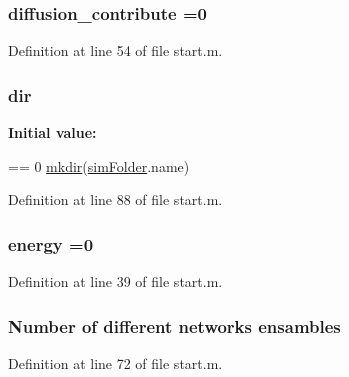 \hypertarget{a00065_a9341167cb56ed18499df723220990b9c}{
\subsubsection[{diffusion\-\_\-contribute}]{\setlength{\rightskip}{0pt plus 5cm}diffusion\-\_\-contribute =0}}\label{a00065_a9341167cb56ed18499df723220990b9c}


Definition at line 54 of file start.\-m.

\hypertarget{a00065_a4ca269cf93df1b512b52174c1a256fe5}{
\subsubsection[{dir}]{\setlength{\rightskip}{0pt plus 5cm}dir}}\label{a00065_a4ca269cf93df1b512b52174c1a256fe5}
{\bfseries Initial value\-:}
\begin{DoxyCode}
== 0
    \hyperlink{a00062_ae58a11ed5ac7873b1039a391d5c86a05}{mkdir}(\hyperlink{a00022_a0ffb8131632b48d9111c3a27d91262e2}{simFolder}.name)
\end{DoxyCode}


Definition at line 88 of file start.\-m.

\hypertarget{a00065_ac002779c383d2cc783e881f94449de66}{
\subsubsection[{energy}]{\setlength{\rightskip}{0pt plus 5cm}energy =0}}\label{a00065_ac002779c383d2cc783e881f94449de66}


Definition at line 39 of file start.\-m.

\hypertarget{a00065_a450b0c257ca2430779e4244700c076e7}{
\subsubsection[{ensambles}]{\setlength{\rightskip}{0pt plus 5cm}Number of different networks ensambles}}\label{a00065_a450b0c257ca2430779e4244700c076e7}


Definition at line 72 of file start.\-m.

